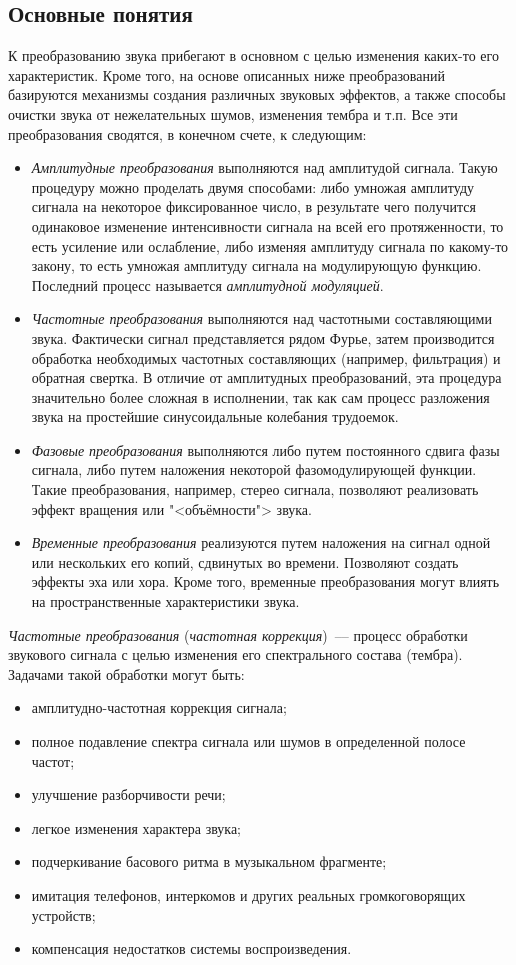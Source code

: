 \documentclass[oneside, final, 14pt]{extreport}
\begin{document}
\subsection{Основные понятия}
К преобразованию звука прибегают в основном с целью изменения каких-то его характеристик. Кроме того, на основе описанных ниже преобразований базируются механизмы создания различных звуковых эффектов, а также способы очистки звука от нежелательных шумов, изменения тембра и т.п. Все эти преобразования сводятся, в конечном счете, к следующим:
\begin{itemize}
  \item \emph{Амплитудные преобразования} выполняются над амплитудой сигнала. Такую процедуру можно проделать двумя способами: либо умножая амплитуду сигнала на некоторое фиксированное число, в результате чего получится одинаковое изменение интенсивности сигнала на всей его протяженности, то есть усиление или ослабление, либо изменяя амплитуду сигнала по какому-то закону, то есть умножая амплитуду сигнала на модулирующую функцию. Последний процесс называется \emph{амплитудной модуляцией}.
  \item \emph{Частотные преобразования} выполняются над частотными составляющими звука. Фактически сигнал представляется рядом Фурье, затем производится обработка необходимых частотных составляющих (например, фильтрация) и обратная свертка. В отличие от амплитудных преобразований, эта процедура значительно более сложная в исполнении, так как сам процесс разложения звука на простейшие синусоидальные колебания трудоемок.
  \item \emph{Фазовые преобразования} выполняются либо путем постоянного сдвига фазы сигнала, либо путем наложения некоторой фазомодулирующей функции. Такие преобразования, например, стерео сигнала, позволяют реализовать эффект вращения или "<объёмности"> звука.
  \item \emph{Временные преобразования} реализуются путем наложения на сигнал одной или нескольких его копий, сдвинутых во времени. Позволяют создать эффекты эха или хора. Кроме того, временные преобразования могут влиять на пространственные характеристики звука.
\end{itemize}

\emph{Частотные преобразования} (\emph{частотная коррекция})~--– процесс обработки звукового сигнала с целью изменения его спектрального состава (тембра).
Задачами такой обработки могут быть:
\begin{itemize}
  \item амплитудно-частотная коррекция сигнала;
  \item полное подавление спектра сигнала или шумов в определенной полосе частот;
  \item улучшение разборчивости речи;
  \item легкое изменения характера звука;
  \item подчеркивание басового ритма в музыкальном фрагменте;
  \item имитация телефонов, интеркомов и других реальных громкоговорящих устройств;
  \item компенсация недостатков системы воспроизведения.
\end{itemize}
	
\end{document}
